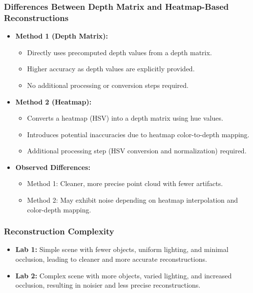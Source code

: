 \documentclass[a4paper]{article}
\begin{document}
\subsubsection*{Differences Between Depth Matrix and Heatmap-Based Reconstructions}
\begin{itemize}
    \item \textbf{Method 1 (Depth Matrix):} 
    \begin{itemize}
        \item Directly uses precomputed depth values from a depth matrix.
        \item Higher accuracy as depth values are explicitly provided.
        \item No additional processing or conversion steps required.
    \end{itemize}
    \item \textbf{Method 2 (Heatmap):} 
    \begin{itemize}
        \item Converts a heatmap (HSV) into a depth matrix using hue values.
        \item Introduces potential inaccuracies due to heatmap color-to-depth mapping.
        \item Additional processing step (HSV conversion and normalization) required.
    \end{itemize}
    \item \textbf{Observed Differences:}
    \begin{itemize}
        \item Method 1: Cleaner, more precise point cloud with fewer artifacts.
        \item Method 2: May exhibit noise depending on heatmap interpolation and color-depth mapping.
    \end{itemize}
\end{itemize}

\subsubsection*{Reconstruction Complexity}
\begin{itemize}
    \item \textbf{Lab 1:} Simple scene with fewer objects, uniform lighting, and minimal occlusion, leading to cleaner and more accurate reconstructions.
    \item \textbf{Lab 2:} Complex scene with more objects, varied lighting, and increased occlusion, resulting in noisier and less precise reconstructions.
\end{itemize}
\end{document}
